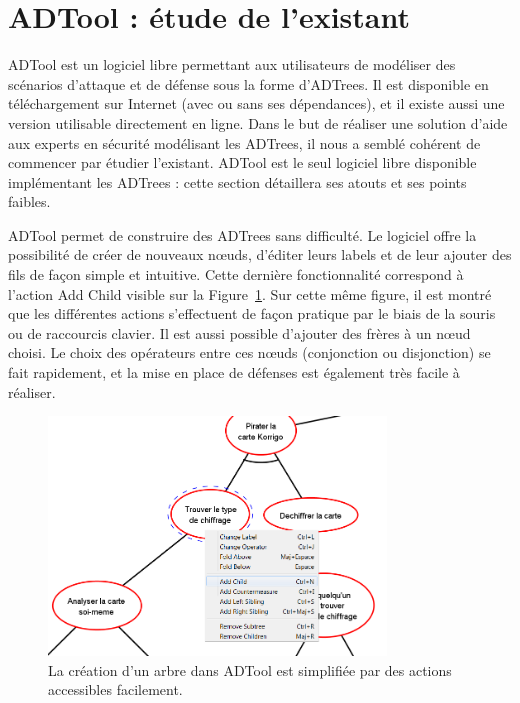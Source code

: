 \section{ADTool : étude de l'existant}
    \label{sec:adtool}

    ADTool est un logiciel libre permettant aux utilisateurs de modéliser des scénarios d'attaque et de défense sous la forme d'ADTrees. Il est disponible en téléchargement sur Internet (avec ou sans ses dépendances), et il existe aussi une version utilisable directement en ligne. Dans le but de réaliser une solution d'aide aux experts en sécurité modélisant les ADTrees, il nous a semblé cohérent de commencer par étudier l'existant. ADTool est le seul logiciel libre disponible implémentant les ADTrees : cette section détaillera ses atouts et ses points faibles.

    ADTool permet de construire des ADTrees sans difficulté. Le logiciel offre la possibilité de créer de nouveaux nœuds, d'éditer leurs labels et de leur ajouter des fils de façon simple et intuitive. Cette dernière fonctionnalité correspond à l'action \og Add Child \fg{} visible sur la {\sc Figure}~\ref{fig:arbre_exemple_1}. Sur cette même figure, il est montré que les différentes actions s'effectuent de façon pratique par le biais de la souris ou de raccourcis clavier. Il est aussi possible d'ajouter des frères à un nœud choisi. Le choix des opérateurs entre ces nœuds (conjonction ou disjonction) se fait rapidement, et la mise en place de défenses est également très facile à réaliser. 
    
    \begin{figure}[h]
        \centering
        \includegraphics[width=0.8\textwidth]{figure/adtool_add_child.png}
        \caption{La création d'un arbre dans ADTool est simplifiée par des actions accessibles facilement.}
        \label{fig:arbre_exemple_1}
    \end{figure}
    
